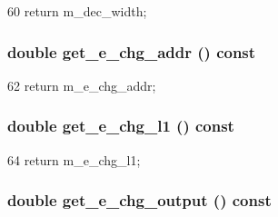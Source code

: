 \begin{DoxyCode}
60 { return m_dec_width; }
\end{DoxyCode}
\hypertarget{classDecoderUnit_aafcd942be3eb33ab99af36e5401fd570}{
\subsubsection[{get\_\-e\_\-chg\_\-addr}]{\setlength{\rightskip}{0pt plus 5cm}double get\_\-e\_\-chg\_\-addr () const}}
\label{classDecoderUnit_aafcd942be3eb33ab99af36e5401fd570}



\begin{DoxyCode}
62 { return m_e_chg_addr; }
\end{DoxyCode}
\hypertarget{classDecoderUnit_ad527ffaaaf60aba8b3951e856b340629}{
\subsubsection[{get\_\-e\_\-chg\_\-l1}]{\setlength{\rightskip}{0pt plus 5cm}double get\_\-e\_\-chg\_\-l1 () const}}
\label{classDecoderUnit_ad527ffaaaf60aba8b3951e856b340629}



\begin{DoxyCode}
64 { return m_e_chg_l1; }
\end{DoxyCode}
\hypertarget{classDecoderUnit_a9ca52057e543e52513d98567c4af50d9}{
\subsubsection[{get\_\-e\_\-chg\_\-output}]{\setlength{\rightskip}{0pt plus 5cm}double get\_\-e\_\-chg\_\-output () const}}
\label{classDecoderUnit_a9ca52057e543e52513d98567c4af50d9}



